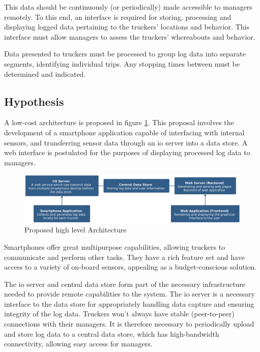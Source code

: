 This data should be continuously (or periodically) made accessible to managers remotely.
To this end, an interface is required for storing, processing and displaying logged data pertaining to the truckers' locations and behavior.
This interface must allow managers to assess the truckers' whereabouts and behavior.

Data presented to truckers must be processed to group log data into separate segments, identifying individual trips.
Any stopping times between must be determined and indicated.

\pagebreak
\subsection{Hypothesis}
A low-cost architecture is proposed in figure \ref{fig:hypothesis}.
This proposal involves the development of a smartphone application capable of interfacing with internal sensors, and transferring sensor data through an \ac{io} server into a data store.
A web interface is postulated for the purposes of displaying processed log data to managers.\cite{bertocco1998client}

\begin{figure}[H]
    \centering
    \includegraphics[width=6in]{../diag/hypothesis.png}
    \caption{Proposed high level Architecture}
    \label{fig:hypothesis}
\end{figure}

Smartphones offer great multipurpose capabilities, allowing truckers to communicate and perform other tasks.
They have a rich feature set and have access to a variety of on-board sensors, appealing as a budget-conscious solution.

The \ac{io} server and central data store form part of the necessary infrastructure needed to provide remote capabilities to the system.
The \ac{io} server is a necessary interface to the data store for appropriately handling data capture and ensuring integrity of the log data.
Truckers won't always have stable (peer-to-peer) connections with their managers.
It is therefore necessary to periodically upload and store log data to a central data store, which has high-bandwidth connectivity, allowing easy access for managers.

